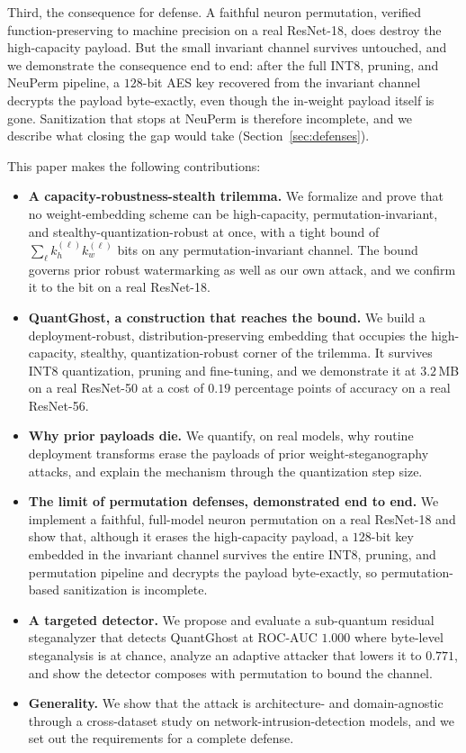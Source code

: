 \documentclass[a4paper,fleqn]{cas-dc}
\theoremstyle{plain}
\theoremstyle{remark}
\newcommand{\sys}{\mbox{QuantGhost}}
\begin{document}
Third, the consequence for defense. A faithful neuron permutation, verified
function-preserving to machine precision on a real ResNet-18, does destroy the
high-capacity payload. But the small invariant channel survives untouched, and we
demonstrate the consequence end to end: after the full INT8, pruning, and NeuPerm
pipeline, a $128$-bit AES key recovered from the invariant channel decrypts the payload
byte-exactly, even though the in-weight payload itself is gone. Sanitization that stops
at NeuPerm is therefore incomplete, and we describe what closing the gap would take
(Section~\ref{sec:defenses}).

This paper makes the following contributions:
\begin{itemize}
\item \textbf{A capacity-robustness-stealth trilemma.} We formalize and prove that no
  weight-embedding scheme can be high-capacity, permutation-invariant, and
  stealthy-quantization-robust at once, with a tight bound of
  $\sum_\ell k_h^{(\ell)} k_w^{(\ell)}$ bits on any permutation-invariant channel. The
  bound governs prior robust watermarking as well as our own attack, and we confirm it
  to the bit on a real ResNet-18.
\item \textbf{\sys, a construction that reaches the bound.} We build a
  deployment-robust, distribution-preserving embedding that occupies the
  high-capacity, stealthy, quantization-robust corner of the trilemma. It survives INT8
  quantization, pruning and fine-tuning, and we demonstrate it at $3.2$\,MB on a real
  ResNet-50 at a cost of $0.19$ percentage points of accuracy on a real ResNet-56.
\item \textbf{Why prior payloads die.} We quantify, on real models, why routine
  deployment transforms erase the payloads of prior weight-steganography attacks, and
  explain the mechanism through the quantization step size.
\item \textbf{The limit of permutation defenses, demonstrated end to end.} We implement
  a faithful, full-model neuron permutation on a real ResNet-18 and show that, although it
  erases the high-capacity payload, a $128$-bit key embedded in the invariant channel
  survives the entire INT8, pruning, and permutation pipeline and decrypts the payload
  byte-exactly, so permutation-based sanitization is incomplete.
\item \textbf{A targeted detector.} We propose and evaluate a sub-quantum residual
  steganalyzer that detects \sys{} at ROC-AUC $1.000$ where byte-level steganalysis is at
  chance, analyze an adaptive attacker that lowers it to $0.771$, and show the detector
  composes with permutation to bound the channel.
\item \textbf{Generality.} We show that the attack is architecture- and domain-agnostic
  through a cross-dataset study on network-intrusion-detection models, and we set out the
  requirements for a complete defense.
\end{itemize}
\end{document}
